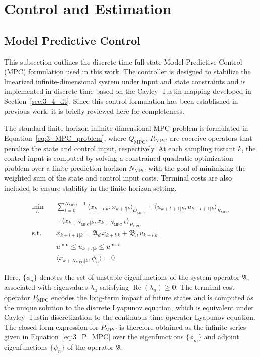 \section{Control and Estimation} \label{sec:3_control}

\subsection{Model Predictive Control} \label{sec:3_mpc}

This subsection outlines the discrete-time full-state Model Predictive Control (MPC) formulation used in this work. The controller is designed to stabilize the linearized infinite-dimensional system under input and state constraints and is implemented in discrete time based on the Cayley--Tustin mapping developed in Section~\ref{sec:3_4_dt}. Since this control formulation has been established in previous work\autocite{Moadeli2025Model}, it is briefly reviewed here for completeness.

The standard finite-horizon infinite-dimensional MPC problem is formulated in Equation~\ref{eq:3_MPC_problem}, where $Q_{\mathrm{MPC}}$, $R_{\mathrm{MPC}}$ are coercive operators that penalize the state and control input, respectively. At each sampling instant $k$, the control input is computed by solving a constrained quadratic optimization problem over a finite prediction horizon $N_{\mathrm{MPC}}$ with the goal of minimizing the weighted sum of the state and control input costs. Terminal costs are also included to ensure stability in the finite-horizon setting.

\begin{equation} \label{eq:3_MPC_problem}
\begin{aligned}
\min_{U} \quad & \sum_{l=0}^{N_{\mathrm{MPC}} - 1} \langle x_{k+l|k}, x_{k+l|k} \rangle_{Q_{\mathrm{MPC}}} + \langle u_{k+l+1|k}, u_{k+l+1|k} \rangle_{R_{\mathrm{MPC}}} \\
&+ \langle x_{k+N_{\mathrm{MPC}}|k}, x_{k+N_{\mathrm{MPC}}|k} \rangle_{P_{\mathrm{MPC}}} \\
\text{s.t.} \quad & x_{k+l+1|k} = \mathfrak{A}_d\, x_{k+l|k} + \mathfrak{B}_d\, u_{k+l|k} \\
& u^{\min} \leq u_{k+l|k} \leq u^{\max} \\
& \langle x_{k+N_{\mathrm{MPC}}|k}, \phi_u \rangle = 0
\end{aligned}
\end{equation}

Here, $\{\phi_u\}$ denotes the set of unstable eigenfunctions of the system operator $\mathfrak{A}$, associated with eigenvalues $\lambda_u$ satisfying $\operatorname{Re}(\lambda_u) \geq 0$. The terminal cost operator $P_{\mathrm{MPC}}$ encodes the long-term impact of future states and is computed as the unique solution to the discrete Lyapunov equation, which is equivalent under Cayley--Tustin discretization to the continuous-time operator Lyapunov equation\autocite{Curtain2020Introduction,Khatibi2021Model}. The closed-form expression for $P_{\mathrm{MPC}}$ is therefore obtained as the infinite series given in Equation~\ref{eq:3_P_MPC} over the eigenfunctions $\{\phi_m\}$ and adjoint eigenfunctions $\{\psi_n\}$ of the operator $\mathfrak{A}$.

